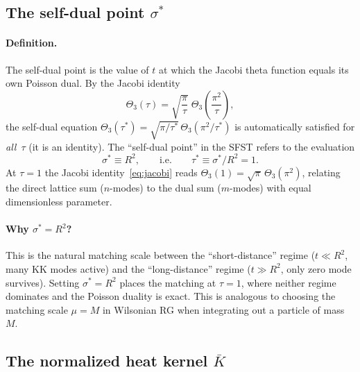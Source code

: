\subsection{The self-dual point $\sigma^*$}

\paragraph{Definition.}
The self-dual point is the value of $t$ at which the Jacobi theta
function equals its own Poisson dual. By the Jacobi identity
\begin{equation}\label{eq:jacobi}
  \Theta_3(\tau) = \sqrt{\frac{\pi}{\tau}}\;\Theta_3\!\left(\frac{\pi^2}{\tau}\right),
\end{equation}
the self-dual equation $\Theta_3(\tau^*) = \sqrt{\pi/\tau^*}\,\Theta_3(\pi^2/\tau^*)$
is automatically satisfied for \emph{all}~$\tau$ (it is an identity).
The ``self-dual point'' in the SFST refers to the evaluation
\begin{equation}\label{eq:sdpoint}
  \sigma^* \equiv R^2,
  \qquad\text{i.e.}\qquad
  \tau^* \equiv \sigma^*/R^2 = 1.
\end{equation}
At $\tau=1$ the Jacobi identity~\eqref{eq:jacobi} reads
$\Theta_3(1) = \sqrt{\pi}\,\Theta_3(\pi^2)$, relating the direct
lattice sum ($n$-modes) to the dual sum ($m$-modes) with equal
dimensionless parameter.

\paragraph{Why $\sigma^*=R^2$?}
This is the natural matching scale between the ``short-distance''
regime ($t\ll R^2$, many KK modes active) and the ``long-distance''
regime ($t\gg R^2$, only zero mode survives). Setting $\sigma^*=R^2$
places the matching at $\tau=1$, where neither regime dominates and
the Poisson duality is exact. This is analogous to choosing the
matching scale $\mu=M$ in Wilsonian RG when integrating out a
particle of mass~$M$.

\subsection{The normalized heat kernel $\bar{K}$}

